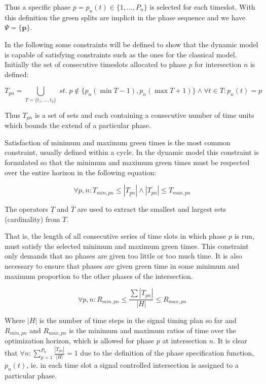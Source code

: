 Thus a specific phase $p = p_n(t) \in \lbrace 1,...,P_n \rbrace$ is selected for each timeslot. With this definition the green splits are implicit in the phase sequence and we have $\Psi = \lbrace \textbf{p} \rbrace $.

In the following some constraints will be defined to show that the dynamic model is capable of satisfying constraints such as the ones for the classical model. Initially the set of consecutive timeslots allocated to phase $p$ for intersection $n$ is defined:

\begin{equation}
T_{pn} = \bigcup_{T = \lbrace t_1,...,t_2 \rbrace} \; st. \; p \not \in \lbrace p_n(\min T - 1), p_n(\max T + 1) \rbrace \wedge\forall t \in T: p_n(t) = p 
\end{equation}

Thus $T_{pn}$ is a set of sets and each containing a consecutive number of time units which bounds the extend of a particular phase.

Satisfaction of minimum and maximum green times is the most common constraint, usually defined within a cycle. In the dynamic model this constraint is formulated so that the minimum and maximum green times must be respected over the entire horizon in the following equation:

\begin{equation}
\label{eqn:minmaxtimes}
\forall p,n : T_{min,pn} \leq |\underline{T_{pn}}| \wedge |\overline{T_{pn}}| \leq T_{max,pn} 
\end{equation}

The operators $\underline{T}$ and $\overline{T}$ are used to extract the smallest and largest sets (cardinality) from $T$.

That is, the length of all consecutive series of time slots in which
phase $p$ is run, must satisfy the selected minimum and maximum green
times. This constraint only demands that no phases are given too
little or too much time. It is also necessary to ensure that phases
are given green time in some minimum and maximum proportion to the
other phases of the intersection.

\begin{equation}
\label{eqn:proportions}
\forall p,n : R_{min,pn} \leq \frac{\sum |T_{pn}|}{|H|} \leq R_{max,pn}
\end{equation}

Where $|H|$ is the number of time steps in the signal timing plan so
far and $R_{min,pn}$ and $R_{max,pn}$ is the minimum and maximum
ratios of time over the optimization horizon, which is allowed for
phase $p$ at intersection $n$. It is clear that $\forall n :
\displaystyle\sum_{p=1}^{P_n}\frac{|T_{pn}|}{|H|} = 1$ due to the
definition of the phase specification function, $p_n(t)$, ie. in each
time slot a signal controlled intersection is assigned to a particular
phase.

